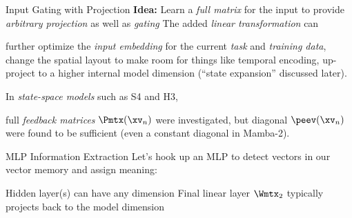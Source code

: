 \begin{slide}[\slideopts,toc={Channel Mixing}]{Input Gating with Projection}
\textbf{Idea:} Learn a \emph{full matrix} for the input to provide \emph{arbitrary projection} as well as \emph{gating}
The added \emph{linear transformation} can 
\begin{itemize}
\mpitem further optimize the \emph{input embedding} for the current \emph{task} and \emph{training data},
\mpitem change the spatial layout to make room for things like temporal encoding,
\mpitem up-project to a higher internal model dimension (``state expansion'' discussed later).
\end{itemize}
In \emph{state-space models} such as S4 and H3,
\begin{itemize}
\mpitem full \emph{feedback matrices} $\Pmtx(\xv_n)$ were investigated, but
\mpitem diagonal $\peev(\xv_n)$ were found to be sufficient (even a constant diagonal in Mamba-2).
\end{itemize}
\end{slide}

\begin{slide}[\slideopts,toc={MLP Layer}]{MLP Information Extraction}
Let's hook up an MLP to detect vectors in our vector memory and assign meaning:
\maybepause
\begin{itemize}
\mpitem Hidden layer(s) can have any dimension
\mpitem Final linear layer $\Wmtx_2$ typically projects back to the model dimension
\end{itemize}
\end{slide}

